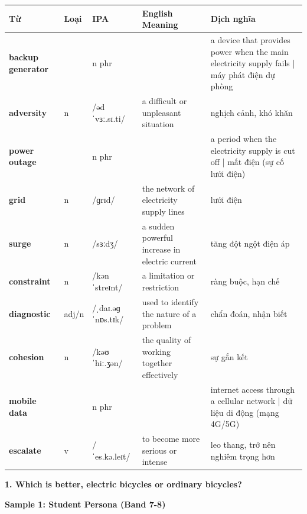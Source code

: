 \vspace{0.8em}
\begin{center}
\renewcommand{\arraystretch}{1.65}
\begin{tabularx}{\textwidth}{|V{0.22\textwidth}|C{0.07\textwidth}|I{0.20\textwidth}|Y|V{0.18\textwidth}|}
\hline
{}
\textbf{Từ} & \textbf{Loại} & \textbf{IPA} & \textbf{English Meaning} & \textbf{Dịch nghĩa} \\
\hline
\textbf{backup generator} & & n phr & & a device that provides power when the main electricity supply fails | máy phát điện dự phòng \\ \hline
\textbf{adversity} & n & /ədˈvɜː.sɪ.ti/ & a difficult or unpleasant situation & nghịch cảnh, khó khăn \\ \hline
\textbf{power outage} & & n phr & & a period when the electricity supply is cut off | mất điện (sự cố lưới điện) \\ \hline
\textbf{grid} & n & /ɡrɪd/ & the network of electricity supply lines & lưới điện \\ \hline
\textbf{surge} & n & /sɜːdʒ/ & a sudden powerful increase in electric current & tăng đột ngột điện áp \\ \hline
\textbf{constraint} & n & /kənˈstreɪnt/ & a limitation or restriction & ràng buộc, hạn chế \\ \hline
\textbf{diagnostic} & adj/n & /ˌdaɪ.əɡˈnɒs.tɪk/ & used to identify the nature of a problem & chẩn đoán, nhận biết \\ \hline
\textbf{cohesion} & n & /kəʊˈhiː.ʒən/ & the quality of working together effectively & sự gắn kết \\ \hline
\textbf{mobile data} & & n phr & & internet access through a cellular network | dữ liệu di động (mạng 4G/5G) \\ \hline
\textbf{escalate} & v & /ˈes.kə.leɪt/ & to become more serious or intense & leo thang, trở nên nghiêm trọng hơn \\ \hline
\end{tabularx}
\end{center}

\partthreeheader

\begin{ieltsquestion}
\textbf{1. Which is better, electric bicycles or ordinary bicycles?}
\end{ieltsquestion}
\textbf{Sample 1: Student Persona (Band 7-8)}

